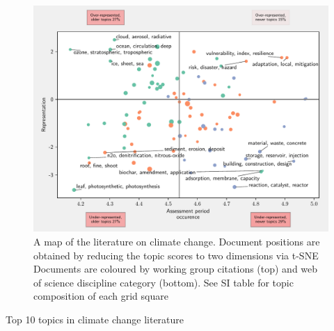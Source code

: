 \documentclass{article}
\begin{document}
\begin{figure}[h!]
	\begin{center}
		\includegraphics[width=0.85\linewidth]{plots/ipcc_representation/ipcc_rep_new1275_all.pdf}
		\caption{A map of the literature on climate change. Document positions are obtained by reducing the topic scores to two dimensions via t-SNE Documents are coloured by working group citations (top) and web of science discipline category (bottom). See SI table for topic composition of each grid square}
		\label{ipcc_rep}
	\end{center}
\end{figure}




\begin{table}[h!]
	\scriptsize
	
	\caption{Top 10 topics in climate change literature}
	\label{top-topics}
\end{table}	
\end{document}
